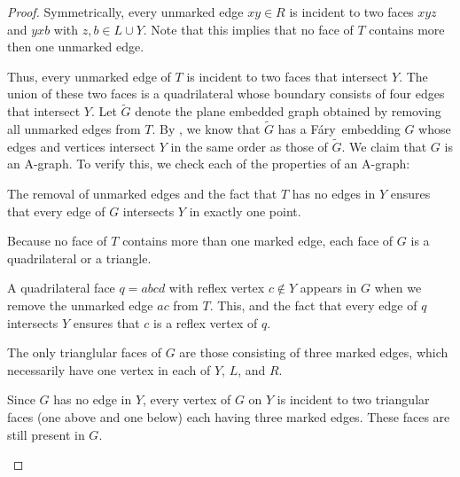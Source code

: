 \documentclass{patmorin}
\newcommand{\Fary}{Fáry}
\begin{document}
\begin{proof}
   Symmetrically, every unmarked edge $xy\in R$ is incident to two faces
   $xyz$ and $yxb$ with $z,b\in L\cup Y$.  Note that this implies that
   no face of $T$ contains more then one unmarked edge.

   Thus, every unmarked edge of $T$ is incident to two faces that
   intersect $Y$.  The union of these two faces is a quadrilateral whose
   boundary consists of four edges that intersect $Y$.
   Let $\tilde{G}$
   denote the plane embedded graph obtained by removing all unmarked edges
   from $T$.  By , we know that $\tilde G$ has
   a \Fary\ embedding $G$ whose edges and vertices intersect $Y$ in the
   same order as those of $\tilde{G}$.  We claim that $G$ is an A-graph.
   To verify this, we check each of the properties of an A-graph:

   \begin{compactenum}
       \item The removal of unmarked edges and the fact that $T$ has no
         edges in $Y$ ensures that every edge of $G$ intersects $Y$
         in exactly one point.
       \item Because no face of $T$ contains more than one marked edge,
        each face of $G$ is a quadrilateral or a triangle.  
       \item A quadrilateral face $q=abcd$ with reflex vertex $c\not\in Y$ appears in $G$ when we remove the unmarked edge $ac$ from $T$.  This, and the fact that every edge of $q$ intersects $Y$ ensures that $c$ is a reflex vertex of $q$.
       \item The only trianglular faces of $G$ are those consisting
       of three marked edges, which necessarily have one vertex in
       each of $Y$, $L$, and $R$.
       \item Since $G$ has no edge in $Y$, every vertex of $G$ on $Y$
       is incident to two triangular faces (one above and one below)
       each having three marked edges. These faces are still present in $G$.
   \end{compactenum}
%
%


\end{proof}
\end{document}
